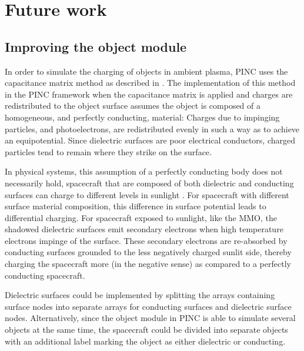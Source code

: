 \chapter{Future work}
\label{sec:future}

\section{Improving the object module}
In order to simulate the charging of objects in ambient plasma, PINC uses the capacitance matrix method as described in \parencite{Miyake2009}. The implementation of this method in the PINC framework when the capacitance matrix is applied and charges are redistributed to the object surface assumes the object is composed of a homogeneous, and perfectly conducting, material: Charges due to impinging particles, and photoelectrons, are redistributed evenly in such a way as to achieve an equipotential. Since dielectric surfaces are poor electrical conductors, charged particles tend to remain where they strike on the surface.

In physical systems, this assumption of a perfectly conducting body does not necessarily hold, spacecraft that are composed of both dielectric and conducting surfaces can charge to different levels in sunlight \parencite{LAI2019}. For spacecraft with different surface material composition, this difference in surface potential leads to differential charging. For spacecraft exposed to sunlight, like the MMO, the shadowed dielectric surfaces emit secondary electrons when high temperature electrons impinge of the surface. These secondary electrons are re-absorbed by conducting surfaces grounded to the less negatively charged sunlit side, thereby charging the spacecraft more (in the negative sense) as compared to a perfectly conducting spacecraft. 

Dielectric surfaces could be implemented by splitting the arrays containing surface nodes into separate arrays for conducting surfaces and dielectric surface nodes. Alternatively, since the object module in PINC is able to simulate several objects at the same time, the spacecraft could be divided into separate objects with an additional label marking the object as either dielectric or conducting.



